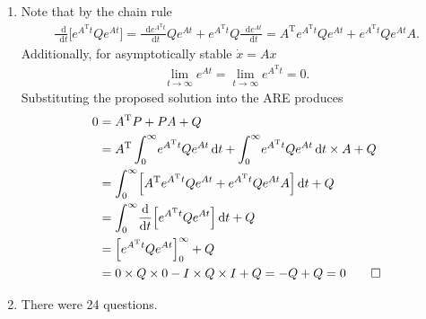 \documentclass[letterpaper,11pt,titlepage]{article}
\newcommand*\dif{\mathop{}\!\mathrm{d}}
\newcommand{\trans}{^\text{T}}
\newcommand*\der[2]{\frac{\dif #1}{\dif #2}}
\begin{document}
\begin{enumerate}[leftmargin=0pt]
    \item Note that by the chain rule
        \begin{gather}
            \der{}{t} \Big[ e^{A\trans t} Q e^{At} \Big] = \der{e^{A\trans t}}{t} Q e^{At} + e^{A\trans t} Q \der{e^{At}}{t} = A\trans e^{A\trans t} Q e^{At} + e^{A\trans t} Q e^{At} A.
        \end{gather}
        Additionally, for asymptotically stable $\dot x=Ax$
        \begin{gather}
            \lim_{t\to\infty} e^{At} = \lim_{t\to\infty} e^{A\trans t} = 0.
        \end{gather}
        Substituting the proposed solution into the ARE produces
        \begin{align}
            0 &= A\trans P + PA + Q \\
              &= A\trans \int_0^\infty\! e^{A\trans t} Q e^{At} \dif t + \int_0^\infty\! e^{A\trans t} Q e^{At} \dif t \times A + Q \\
              &= \int_0^\infty\! \Big[ A\trans e^{A\trans t} Q e^{At} + e^{A\trans t} Q e^{At} A \Big] \dif t + Q \\
              &= \int_0^\infty\! \der{}{t} \Big[ e^{A\trans t} Q e^{At} \Big] \dif t + Q \\
              &= \Big[ e^{A\trans t} Q e^{At} \Big]_0^\infty + Q \\
              &= 0\times Q\times 0 - I\times Q\times I + Q = -Q + Q = 0 \qed
        \end{align}

    \item There were 24 questions.

\end{enumerate}
\end{document}

